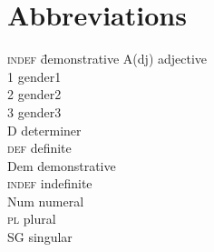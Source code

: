 \documentclass[output=paper]{langscibook}
\begin{document}



\section*{Abbreviations}


\begin{multicols}{3}
\begin{tabbing}
\textsc{indef} \= demonstrative\kill
A(dj) \> adjective\\
1 \> gender1\\
2 \> gender2\\
3 \> gender3\\
D \> determiner\\
\textsc{def} \> definite\\
Dem \> demonstrative\\
\textsc{indef} \> indefinite\\
Num \> numeral\\
\textsc{pl} \> plural\\
SG \> singular
\end{tabbing}
\end{multicols}


{\sloppy
\printbibliography[heading=subbibliography,notkeyword=this] 
}
\end{document}
